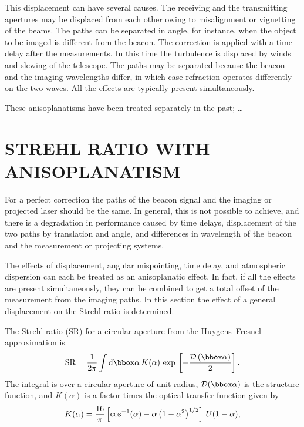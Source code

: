 This displacement can  have several causes.  The receiving and the
transmitting apertures may  be displaced from each other owing to
misalignment or vignetting of the  beams.  The paths can be
separated in angle, for instance, when the  object to be imaged is
different from the beacon.  The correction is  applied with a time
delay after the measurements.  In this time the  turbulence is
displaced by winds and slewing of the telescope.  The  paths may be
separated because the beacon and the imaging wavelengths  differ,
in which case refraction operates differently on the two waves.
All the  effects are typically present simultaneously.

These  anisoplanatisms have been treated separately in the
past\cite{1,2,3,4,5,6,7}; \ldots

\section{ STREHL RATIO WITH ANISOPLANATISM}
\label{SR}
For a perfect correction the  paths of the beacon signal and the
imaging or projected laser should be  the same.  In general, this
is not possible to achieve, and there is a  degradation in
performance caused by time delays, displacement of the  two paths
by translation and angle, and differences in wavelength of the
beacon and the measurement or projecting systems.

The effects of
displacement, angular mispointing, time delay, and atmospheric
dispersion can each be treated as an anisoplanatic effect.  In
fact, if  all the effects are present simultaneously, they can be
combined to get  a total offset of the measurement from the imaging
paths.  In this  section the effect of a general displacement on
the Strehl ratio is  determined.

The Strehl ratio (SR) for a circular aperture \cite{7} from  the
Huygens--Fresnel approximation is  \begin{eqnarray}{\rm  SR}
={1 \over {2\pi }}\int {{\rm d}\bbox  \alpha }\,K(\alpha )\,\exp
\,\left[ {-{{{\cal D}\left( {\bbox \alpha } \right)}  \over 2}}
\right].\end{eqnarray}  The integral is over a circular aperture of
unit radius,  ${\cal D}( {\bbox \alpha } )$  is the structure
function, and  $K(\alpha )$  is a  factor times the optical
transfer function given by  \begin{eqnarray}K(\alpha )={{16} \over
\pi }\left[ {\cos ^{- 1}(\alpha )-\alpha \left( {1-\alpha ^2}
\right)^{1/ 2}} \right]\,U(1- \alpha ),\end{eqnarray}

